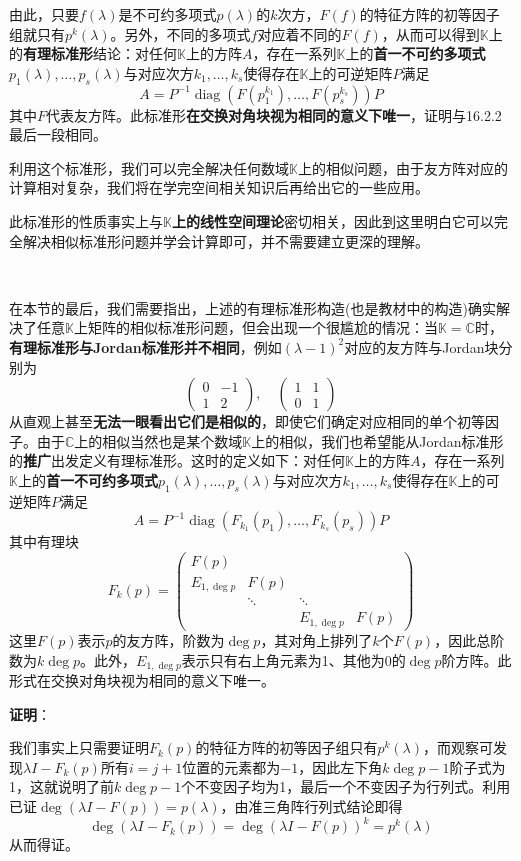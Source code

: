 \documentclass[a4paper,UTF8,fontset=windows,AutoFakeBold]{ctexart}
\DeclareMathOperator{\diag}{diag}
\newcommand*{\note}{\noindent *}
\newcommand{\proo}[1]{{\vspace{5pt}\kaishu\noindent\textbf{证明}：\vspace{-3pt}
\begin{compactitem}
    \item[] #1
\end{compactitem}
}}
\begin{document}
由此，只要$f(\lambda)$是不可约多项式$p(\lambda)$的$k$次方，$F(f)$的特征方阵的初等因子组就只有$p^k(\lambda)$。另外，不同的多项式$f$对应着不同的$F(f)$，从而可以得到$\mathbb{K}$上的\textbf{有理标准形}结论：对任何$\mathbb{K}$上的方阵$A$，存在一系列$\mathbb{K}$上的\textbf{首一不可约多项式}$p_1(\lambda),\dots,p_s(\lambda)$与对应次方$k_1,\dots,k_s$使得存在$\mathbb{K}$上的可逆矩阵$P$满足
$$A=P^{-1}\diag(F(p_1^{k_1}),\dots,F(p_s^{k_s}))P$$
其中$F$代表友方阵。此标准形\textbf{在交换对角块视为相同的意义下唯一}，证明与16.2.2最后一段相同。

利用这个标准形，我们可以完全解决任何数域$\mathbb{K}$上的相似问题，由于友方阵对应的计算相对复杂，我们将在学完空间相关知识后再给出它的一些应用。

\note 此标准形的性质事实上与\textbf{$\mathbb{K}$上的线性空间理论}密切相关，因此到这里明白它可以完全解决相似标准形问题并学会计算即可，并不需要建立更深的理解。

\

在本节的最后，我们需要指出，上述的有理标准形构造(也是教材中的构造)确实解决了任意$\mathbb{K}$上矩阵的相似标准形问题，但会出现一个很尴尬的情况：当$\mathbb{K}=\mathbb{C}$时，\textbf{有理标准形与Jordan标准形并不相同}，例如$(\lambda-1)^2$对应的友方阵与Jordan块分别为
$$\begin{pmatrix}0&-1\\1&2\end{pmatrix},\quad\begin{pmatrix}1&1\\0&1\end{pmatrix}$$
从直观上甚至\textbf{无法一眼看出它们是相似的}，即使它们确定对应相同的单个初等因子。由于$\mathbb{C}$上的相似当然也是某个数域$\mathbb{K}$上的相似，我们也希望能从Jordan标准形的\textbf{推广}出发定义有理标准形。这时的定义如下：对任何$\mathbb{K}$上的方阵$A$，存在一系列$\mathbb{K}$上的\textbf{首一不可约多项式}$p_1(\lambda),\dots,p_s(\lambda)$与对应次方$k_1,\dots,k_s$使得存在$\mathbb{K}$上的可逆矩阵$P$满足
$$A=P^{-1}\diag(F_{k_1}(p_1),\dots,F_{k_s}(p_s))P$$
其中有理块
$$F_k(p)=\begin{pmatrix}F(p)\\E_{1,\deg p}&F(p)\\ &\ddots&\ddots&\\ &&E_{1,\deg p}&F(p)\end{pmatrix}$$
这里$F(p)$表示$p$的友方阵，阶数为$\deg p$，其对角上排列了$k$个$F(p)$，因此总阶数为$k\deg p$。此外，$E_{1,\deg p}$表示只有右上角元素为1、其他为0的$\deg p$阶方阵。此形式在交换对角块视为相同的意义下唯一。

\proo{
    我们事实上只需要证明$F_k(p)$的特征方阵的初等因子组只有$p^k(\lambda)$，而观察可发现$\lambda I-F_k(p)$所有$i=j+1$位置的元素都为$-1$，因此左下角$k\deg p-1$阶子式为1，这就说明了前$k\deg p-1$个不变因子均为1，最后一个不变因子为行列式。利用已证$\deg(\lambda I-F(p))=p(\lambda)$，由准三角阵行列式结论即得
    $$\deg(\lambda I-F_k(p))=\deg(\lambda I-F(p))^k=p^k(\lambda)$$
    从而得证。
}
\end{document}
